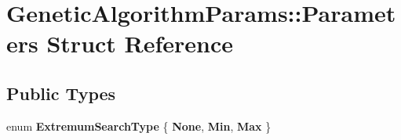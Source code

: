 \hypertarget{struct_genetic_algorithm_params_1_1_parameters}{}\section{Genetic\+Algorithm\+Params\+:\+:Parameters Struct Reference}
\label{struct_genetic_algorithm_params_1_1_parameters}
\subsection*{Public Types}
\begin{DoxyCompactItemize}
\item 
enum {\bfseries Extremum\+Search\+Type} \{ {\bfseries None}, 
{\bfseries Min}, 
{\bfseries Max}
 \}\hypertarget{struct_genetic_algorithm_params_1_1_parameters_a4abcc00278515e339ac9cef36b07c14a}{}\label{struct_genetic_algorithm_params_1_1_parameters_a4abcc00278515e339ac9cef36b07c14a}

\end{DoxyCompactItemize}
